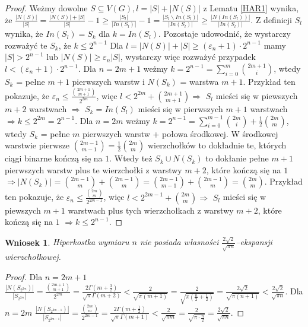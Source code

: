\documentclass{pracamgr}
\newtheorem{corollary}[theorem]{Wniosek}
\begin{document}
   \begin{proof}
    Weżmy dowolne $S\subseteq V(G), l=|S|+|N(S)|$ z Lematu \ref{HAR1} wynika, że
    $\frac{|N(S)|}{|S|}=\frac{|N(S)|+|S|}{|S|}-1\ge\frac{|S_l|}{|In(S_l)|}-1=\frac{|S_l\backslash In(S_l)|}{|In(S_l)|}\ge\frac{|N(In(S_l))|}{|In(S_l)|}$.
    Z definicji $S_l$ wynika, że $In(S_l)=S_k$ dla $k=In(S_l)$.\newline
    Pozostaje udowodnić, że wystarczy rozważyć te $S_k$, że $k\le2^{n-1}$\newline
    Dla $l=|N(S)|+|S|\ge(\varepsilon_n+1)\cdot 2^{n-1}$ mamy $|S|>2^{n-1}$ lub $|N(S)|\ge\varepsilon_n|S|$, wystarczy więc rozważyć przypadek
    $l<(\varepsilon_n+1)\cdot 2^{n-1}$.\newline
    Dla $n=2m+1$ weżmy $k=2^{n-1}=\sum_{i=0}^{m}{2m+1 \choose i}$, wtedy $S_k$ = pełne $m+1$ pierwszych warstw i $N(S_k)$ = warstwa $m+1$.
    Przykład ten pokazuje, że $\varepsilon_n\le\frac{{2m+1 \choose m+1}}{2^{2m}}$,
    więc $l<2^{2m}+{2m+1 \choose m+1}\Rightarrow$ $S_l$ mieści się w piewszych $m+2$ warstwach
    $\Rightarrow$ $S_k=In(S_l)$ mieści się w pierwszych $m+1$ warstwach $\Rightarrow k\le 2^{2m}=2^{n-1}$.\newline
    Dla $n=2m$ weżmy $k=2^{n-1}=\sum_{i=0}^{m-1}{2m \choose i}+\frac{1}{2}{2m\choose m}$, wtedy $S_k$ = pełne $m$ pierwszych warstw + połowa środkowej.
    W środkowej warstwie pierwsze ${2m-1\choose m-1}=\frac{1}{2}{2m \choose m}$ wierzchołków to dokładnie te, których ciągi binarne kończą się na $1$.
    Wtedy też $S_k\cup N(S_k)$ to dokłanie pełne $m+1$ pierwszych warstw plus te wierzchołki z warstwy $m+2$, które kończą się na $1$
    $\Rightarrow |N(S_k)|={2m-1\choose m}+{2m-1\choose m}={2m-1\choose m-1}+{2m-1 \choose m}={2m\choose m}$.
    Przykład ten pokazuje, że $\varepsilon_n\le\frac{{2m \choose m}}{2^{2m-1}}$,
    więc $l<2^{2m-1}+{2m \choose m}\Rightarrow$ $S_l$ mieści się w piewszych $m+1$ warstwach plus tych wierzchołkach z warstwy $m+2$, które kończą się na $1$
    $\Rightarrow k\le2^{n-1}$.
   \end{proof}
   \begin{corollary}\label{ograniczenie ekspansji}
    Hiperkostka wymiaru $n$ nie posiada własności $\frac{2\sqrt{2}}{\sqrt{\pi n}}$--ekspansji wierzchołkowej.
   \end{corollary}
   \begin{proof}
    Dla $n=2m+1$\newline
    $\frac{|N(S_{2^{2m}})|}{|S_{2^{2m}}|}=\frac{{2m+1 \choose m+1}}{2^{2m}}=\frac{2\Gamma(m+\frac{3}{2})}{\sqrt{\pi}\Gamma(m+2)}<\frac{2}{\sqrt{\pi(m+1)}}=
    \frac{2}{\sqrt{\pi(\frac{n}{2}+\frac{1}{2})}}=\frac{2\sqrt{2}}{\sqrt{\pi(n+1)}}<\frac{2\sqrt{2}}{\sqrt{\pi n}}$.\newline
    Dla $n=2m$
    $\frac{|N(S_{2^{2m-1}})|}{|S_{2^{2m-1}}|}=\frac{{2m \choose m}}{2^{2m-1}}=\frac{2\Gamma(m+\frac{1}{2})}{\sqrt{\pi}\Gamma(m+1)}<\frac{2}{\sqrt{\pi m}}=
    \frac{2}{\sqrt{\pi\cdot\frac{n}{2}}}=\frac{2\sqrt{2}}{\sqrt{\pi n}}$.
   \end{proof}
\end{document}
